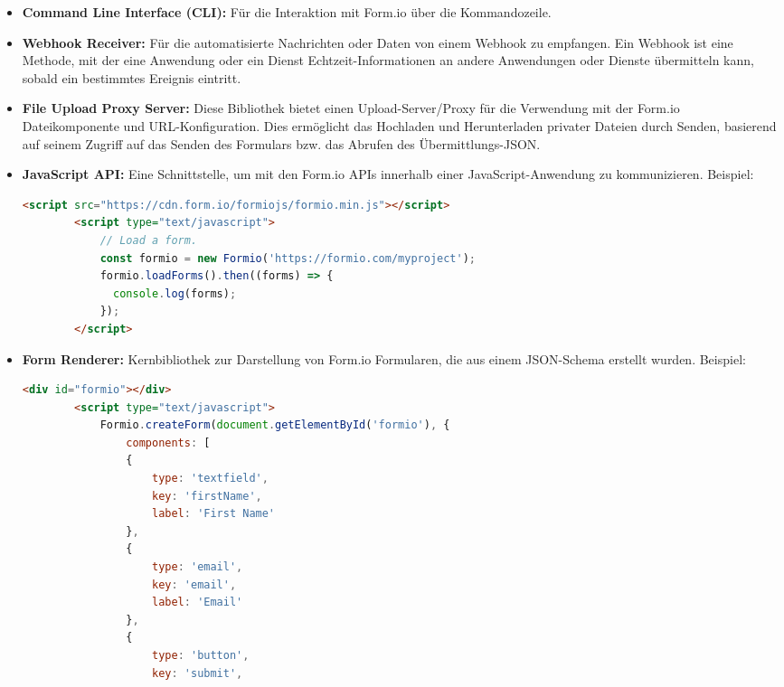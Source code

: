 \begin{itemize}
    \item \textbf{Command Line Interface (CLI):} Für die Interaktion mit Form.io über die Kommandozeile.
    \item \textbf{Webhook Receiver:} Für die automatisierte Nachrichten oder Daten von einem Webhook zu empfangen. Ein Webhook ist eine Methode, mit der eine Anwendung oder ein Dienst Echtzeit-Informationen an andere Anwendungen oder Dienste übermitteln kann, sobald ein bestimmtes Ereignis eintritt.
    \item \textbf{File Upload Proxy Server:} Diese Bibliothek bietet einen Upload-Server/Proxy für die Verwendung mit der Form.io Dateikomponente und URL-Konfiguration. Dies ermöglicht das Hochladen und Herunterladen privater Dateien durch Senden, basierend auf seinem Zugriff auf das Senden des Formulars bzw. das Abrufen des Übermittlungs-JSON. 
    \item \textbf{JavaScript API:} Eine Schnittstelle, um mit den Form.io APIs innerhalb einer JavaScript-Anwendung zu kommunizieren. Beispiel:
    \begin{adjustwidth}{-5em}{0pt}
    \begin{lstlisting}[language=HTML]
        <script src="https://cdn.form.io/formiojs/formio.min.js"></script>
        <script type="text/javascript">
            // Load a form.
            const formio = new Formio('https://formio.com/myproject');
            formio.loadForms().then((forms) => {
              console.log(forms);
            });
        </script>
    \end{lstlisting}
    \end{adjustwidth}
    \item \textbf{Form Renderer:} Kernbibliothek zur Darstellung von Form.io Formularen, die aus einem JSON-Schema erstellt wurden. Beispiel:
    \begin{adjustwidth}{-5em}{0pt}
    \begin{lstlisting}[language=HTML]
        <div id="formio"></div>
        <script type="text/javascript">
            Formio.createForm(document.getElementById('formio'), {
                components: [
                {
                    type: 'textfield',
                    key: 'firstName',
                    label: 'First Name'
                },
                {
                    type: 'email',
                    key: 'email',
                    label: 'Email'
                },
                {
                    type: 'button',
                    key: 'submit',

\end{lstlisting}
\end{adjustwidth}
\end{itemize}
